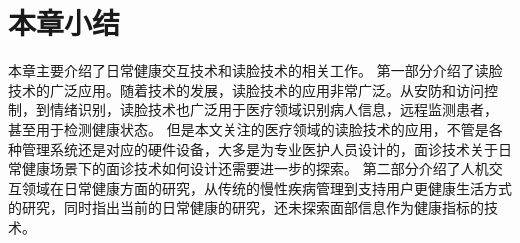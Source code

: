 
 




\section{本章小结}
本章主要介绍了日常健康交互技术和读脸技术的相关工作。
第一部分介绍了读脸技术的广泛应用。随着技术的发展，读脸技术的应用非常广泛。从安防和访问控制，到情绪识别，读脸技术也广泛用于医疗领域识别病人信息，远程监测患者， 甚至用于检测健康状态。
但是本文关注的医疗领域的读脸技术的应用，不管是各种管理系统还是对应的硬件设备，大多是为专业医护人员设计的，面诊技术关于日常健康场景下的面诊技术如何设计还需要进一步的探索。
第二部分介绍了人机交互领域在日常健康方面的研究，从传统的慢性疾病管理到支持用户更健康生活方式的研究，同时指出当前的日常健康的研究，还未探索面部信息作为健康指标的技术。

